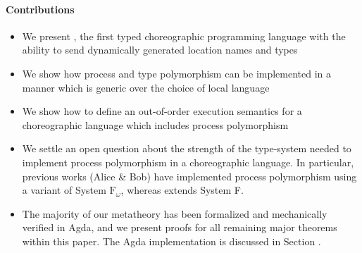 \paragraph{Contributions}
\begin{itemize}
	\item We present \langname, the first typed choreographic programming language with the ability to send dynamically generated location names and types 
	\item We show how process  and type polymorphism can be implemented in a manner which is generic over the choice of local language
	\item We show how to define an out-of-order execution semantics for a choreographic language which includes process polymorphism
	\item We settle an open question about the strength of the type-system needed to implement process polymorphism in a choreographic language.
  In particular, previous works (Alice \& Bob) have implemented process polymorphism using a variant of System $\text{F}_\omega$, whereas \langname extends System F.
	\item The majority of our metatheory has been formalized and mechanically verified in Agda, and we present proofs for all remaining major theorems within this paper.
  The Agda implementation is discussed in Section \todo.
\end{itemize}

